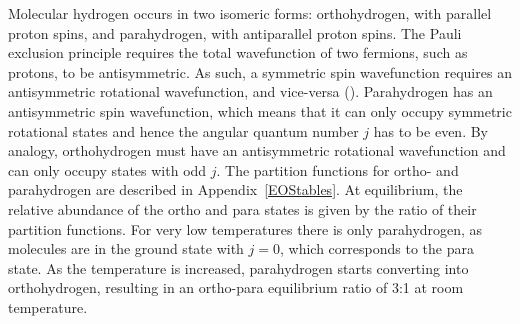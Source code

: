 \documentclass[apj]{emulateapj}
\newcommand{\App}[1]{Appendix~\ref{#1}}
\begin{document}

 Molecular hydrogen occurs in two isomeric forms: orthohydrogen, with parallel proton spins, and parahydrogen, with antiparallel proton spins. The Pauli exclusion principle requires the total wavefunction of two fermions, such as protons, to be antisymmetric. As such, a symmetric spin wavefunction requires an antisymmetric rotational wavefunction, and vice-versa (\citealt{farkas35}). Parahydrogen has an antisymmetric spin wavefunction, which means that it can only occupy symmetric rotational states and hence the angular quantum number $j$ has to be even. By analogy, orthohydrogen must have an antisymmetric rotational wavefunction and can only occupy states with odd $j$. The partition functions for ortho- and parahydrogen are described in \App{EOStables}.
 At equilibrium, the relative abundance of the ortho and para states is given by the ratio of their partition functions. For very low temperatures there is only parahydrogen, as molecules are in the ground state with $j=0$, which corresponds to the para state. As the temperature is increased, parahydrogen starts converting into orthohydrogen, resulting in an ortho-para equilibrium ratio of 3:1 at room temperature.

\end{document}
